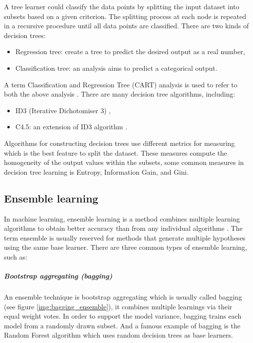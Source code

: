 A tree learner could classify the data points by splitting the input dataset into subsets based on a given criterion. The splitting process at each node is repeated in a recursive procedure until all data points are classified. There are two kinds of decision trees:

\begin{itemize}
\item Regression tree: create a tree to predict the desired output as a real number,
\item Classification tree: an analysis aims to predict a categorical output.
\end{itemize}

A term Classification and Regression Tree (CART) analysis is used to refer to both the above analysis \citep{breiman1984classification}. There are many decision tree algorithms, including:

\begin{itemize}
\item ID3 (Iterative Dichotomiser 3) \citep{quinlan1986induction},
\item C4.5: an extension of ID3 algorithm \citep{quinlan2014c4}.
\end{itemize}

Algorithms for constructing decision trees use different metrics for measuring which is the best feature to split the dataset. These measures compute the homogeneity of the output values within the subsets, some common measures in decision tree learning is Entropy, Information Gain, and Gini.


\subsection*{Ensemble learning}

In machine learning, ensemble learning is a method combines multiple learning algorithms to obtain better accuracy than from any individual algorithms \citep{opitz1999popular, rokach2010ensemble}. The term ensemble is usually reserved for methods that generate multiple hypotheses using the same base learner. There are three common types of ensemble learning, such as:


\subparagraph{Bootstrap aggregating (bagging)}

An ensemble technique is bootstrap aggregating which is usually called bagging (see figure \ref{img:bagging_ensemble}), it combines multiple learnings via their equal weight votes. In order to support the model variance, bagging trains each model from a randomly drawn subset. And a famous example of bagging is the Random Forest algorithm which uses random decision trees as base learners.


